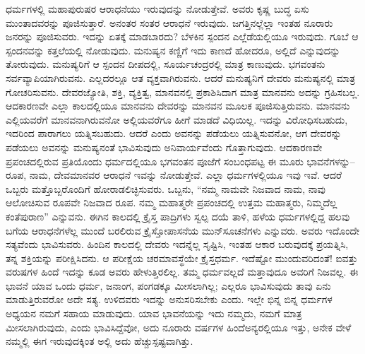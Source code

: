 ಧರ್ಮಗಳಲ್ಲಿ ಮಹಾಪುರುಷರ ಆರಾಧನೆಯು ಇರುವುದನ್ನು ನೋಡುತ್ತೇವೆ. ಅವರು ಕೃಷ್ಣ ಬುದ್ಧ ಏಸು ಮುಂತಾದವರನ್ನು ಪೂಜಿಸುತ್ತಾರೆ. ಅನಂತರ ಸಂತರ ಆರಾಧನೆ ಇರುವುದು. ಜಗತ್ತಿನಲ್ಲೆಲ್ಲಾ ಇಂತಹ ನೂರಾರು ಜನರನ್ನು ಪೂಜಿಸುವರು. ಇದನ್ನು ಏತಕ್ಕೆ ಮಾಡಬಾರದು? ಬೆಳಕಿನ ಸ್ಪಂದನ ಎಲ್ಲೆಡೆಯಲ್ಲಿಯೂ ಇರುವುದು. ಗೂಬೆ ಆ ಸ್ಪಂದನವನ್ನು ಕತ್ತಲೆಯಲ್ಲಿ ನೋಡುವುದು. ಮನುಷ್ಯನ ಕಣ್ಣಿಗೆ ಇದು ಕಾಣದೆ ಹೋದರೂ, ಅಲ್ಲಿದೆ ಎನ್ನುವುದನ್ನು ತೋರುವುದು. ಮನುಷ್ಯರಿಗೆ ಆ ಸ್ಪಂದನ ದೀಪದಲ್ಲಿ, ಸೂರ್ಯಚಂದ್ರರಲ್ಲಿ ಮಾತ್ರ ಕಾಣುವುದು. ಭಗವಂತನು ಸರ್ವವ್ಯಾಪಿಯಾಗಿರುವನು. ಎಲ್ಲದರಲ್ಲೂ ಆತ ವ್ಯಕ್ತವಾಗಿರುವನು. ಆದರೆ ಮನುಷ್ಯನಿಗೆ ದೇವರು ಮನುಷ್ಯನಲ್ಲಿ ಮಾತ್ರ ಗೋಚರಿಸುವನು. ದೇವರಜ್ಯೋತಿ, ಶಕ್ತಿ, ವ್ಯಕ್ತಿತ್ವ, ಮಾನವನಲ್ಲಿ ಪ್ರಕಾಶಿಸಿದಾಗ ಮಾತ್ರ ಮಾನವನು ಅದನ್ನು ಗ್ರಹಿಸಬಲ್ಲ. ಆದಕಾರಣವೇ ಎಲ್ಲಾ ಕಾಲದಲ್ಲಿಯೂ ಮಾನವನು ದೇವರನ್ನು ಮಾನವನ ಮೂಲಕ ಪೂಜಿಸುತ್ತಿರುವನು. ಮಾನವನು ಎಲ್ಲಿಯವರೆಗೆ ಮಾನವನಾಗಿರುವನೋ ಅಲ್ಲಿಯವರೆಗೂ ಹೀಗೆ ಮಾಡದೆ ವಿಧಿಯಿಲ್ಲ. ಇದನ್ನು ವಿರೋಧಿಸಬಹುದು, ಇದರಿಂದ ಪಾರಾಗಲು ಯತ್ನಿಸಬಹುದು. ಆದರೆ ಎಂದು ಅವನನ್ನು ಪಡೆಯಲು ಯತ್ನಿಸುವನೋ, ಆಗ ದೇವರನ್ನು ಪಡೆಯಲು ಅವನನ್ನು ಮನುಷ್ಯನಂತೆ ಭಾವಿಸುವುದು ಅನಿವಾರ್ಯವೆಂದು ಗೊತ್ತಾಗುವುದು. ಆದಕಾರಣವೇ ಪ್ರಪಂಚದಲ್ಲಿರುವ ಪ್ರತಿಯೊಂದು ಧರ್ಮದಲ್ಲಿಯೂ ಭಗವಂತನ ಪೂಜೆಗೆ ಸಂಬಂಧಪಟ್ಟ ಈ ಮೂರು ಭಾವನೆಗಳನ್ನು–ರೂಪ, ನಾಮ, ದೇವಮಾನವರ ಆರಾಧನೆ ಇವನ್ನು ನೋಡುತ್ತೇವೆ. ಎಲ್ಲಾ ಧರ್ಮಗಳಲ್ಲಿಯೂ ಇವು ಇವೆ. ಆದರೆ ಒಬ್ಬರು ಮತ್ತೊಬ್ಬರೊಂದಿಗೆ ಹೋರಾಡಲಿಚ್ಛಿಸುವರು. ಒಬ್ಬನು, “ನಮ್ಮ ನಾಮವೇ ನಿಜವಾದ ನಾಮ, ನಾವು ಆಲೋಚಿಸುವ ರೂಪವೇ ನಿಜವಾದ ರೂಪ. ನಮ್ಮ ಮಹಾತ್ಮರೇ ಪ್ರಪಂಚದಲ್ಲಿ ಉತ್ತಮ ಮಹಾತ್ಮರು, ನಿಮ್ಮದೆಲ್ಲ ಕಂತೆಪುರಾಣ” ಎನ್ನುವನು. ಈಗಿನ ಕಾಲದಲ್ಲಿ ಕ್ರೈಸ್ತ ಪಾದ್ರಿಗಳು ಸ್ವಲ್ಪ ದಯೆ ತಾಳಿ, ಹಳೆಯ ಧರ್ಮಗಳಲ್ಲಿದ್ದ ಹಲವು ಬಗೆಯ ಆರಾಧನೆಗಳೆಲ್ಲ ಮುಂದೆ ಬರಲಿರುವ ಕ್ರೈಸ್ತೋಪಾಸನೆಯ ಮುನ್​ಸೂಚನೆಗಳು ಎನ್ನುವರು. ಅವರು ಇದೊಂದೇ ಸತ್ಯವೆಂದು ಭಾವಿಸುವರು. ಹಿಂದಿನ ಕಾಲದಲ್ಲಿ ದೇವರು ಇದನ್ನೆಲ್ಲ ಸೃಷ್ಟಿಸಿ, ಇಂತಹ ಆಕಾರ ಬರುವುದಕ್ಕೆ ಪ್ರಯತ್ನಿಸಿ, ತನ್ನ ಶಕ್ತಿಯನ್ನು ಪರೀಕ್ಷಿಸಿದನು. ಆ ಪರೀಕ್ಷೆಯ ಚರಮಾವ\-ಸ್ಥೆಯೇ ಕ್ರೈಸ್ತಧರ್ಮ. ಇದೆಷ್ಟೋ ಮುಂದುವರಿದಂತೆ! ಐವತ್ತು ವರುಷ\-ಗಳ ಹಿಂದೆ ಇದನ್ನು ಕೂಡ ಅವರು ಹೇಳುತ್ತಿರಲಿಲ್ಲ. ತಮ್ಮ ಧರ್ಮವಲ್ಲದೆ ಮತ್ತಾವುದೂ ಅವರಿಗೆ ನಿಜವಲ್ಲ. ಈ ಭಾವನೆ ಯಾವ ಒಂದು ಧರ್ಮ, ಜನಾಂಗ, ಪಂಗಡಕ್ಕೂ ಮೀಸಲಾಗಿಲ್ಲ; ಎಲ್ಲರೂ ಭಾವಿಸುವುದು ತಾವು ಏನು ಮಾಡುತ್ತಿರುವರೋ ಅದೇ ಸತ್ಯ. ಉಳಿದವರು ಇದನ್ನು ಅನುಸರಿಸಬೇಕು ಎಂದು. ಇಲ್ಲೇ ಭಿನ್ನ ಬಿನ್ನ ಧರ್ಮಗಳ ಅಧ್ಯಯನ ನಮಗೆ ಸಹಾಯ ಮಾಡುವುದು. ಯಾವ ಭಾವನೆಯನ್ನು ಇದು ನಮ್ಮದು, ನಮಗೆ ಮಾತ್ರ ಮೀಸಲಾಗಿರುವುದು, ಎಂದು ಭಾವಿಸಿದ್ದೆವೋ, ಅದು ನೂರಾರು ವರ್ಷಗಳ ಹಿಂದೆ\break ಅನ್ಯರಲ್ಲಿಯೂ ಇತ್ತು, ಅನೇಕ ವೇಳೆ ನಮ್ಮಲ್ಲಿ ಈಗ ಇರುವುದಕ್ಕಿಂತ ಅಲ್ಲಿ ಅದು ಹೆಚ್ಚು\break ಸ್ಪಷ್ಟವಾಗಿತ್ತು.

